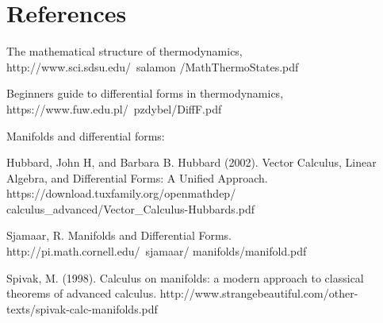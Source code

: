 \documentclass[12pt]{article}
\begin{document}
\section{References}
\begin{enumerate}[label={[\arabic*]}]
  \item The mathematical structure of thermodynamics, http://www.sci.sdsu.edu/~salamon /MathThermoStates.pdf
  \item Beginners guide to differential forms in thermodynamics,
https://www.fuw.edu.pl/~pzdybel/DiffF.pdf
\end{enumerate} Manifolds and differential forms:
\begin{enumerate}[label={[\arabic*]}]
\setcounter{enumi}{2}
\item Hubbard, John H, and Barbara B. Hubbard (2002). Vector Calculus, Linear Algebra, and Differential Forms: A Unified Approach. https://download.tuxfamily.org/openmathdep/ calculus\_advanced/Vector\_Calculus-Hubbards.pdf
\item Sjamaar, R. Manifolds and Differential Forms. http://pi.math.cornell.edu/~sjamaar/ manifolds/manifold.pdf
\item Spivak, M. (1998). Calculus on manifolds: a modern approach to classical theorems of advanced calculus. http://www.strangebeautiful.com/other-texts/spivak-calc-manifolds.pdf
\end{enumerate}
\end{document}
